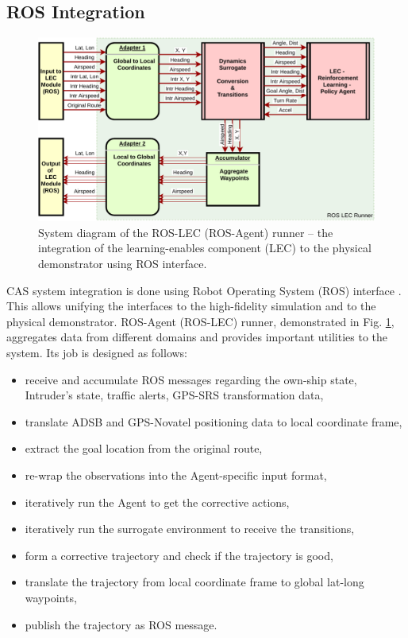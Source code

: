 \subsection{ROS Integration}

\begin{figure}[h]
	\centering
	\includegraphics[width=\linewidth]{figures/cp25_ros.pdf}
	\caption{System diagram of the ROS-LEC (ROS-Agent) runner -- the integration of the learning-enables component (LEC) to the physical demonstrator using ROS interface.}
	\label{fig:integration}
\end{figure}

CAS system integration is done using Robot Operating System (ROS) interface \cite{quigley2009ros}. This allows unifying the interfaces to the high-fidelity simulation and to the physical demonstrator.
ROS-Agent (ROS-LEC) runner, demonstrated in Fig. \ref{fig:integration}, aggregates data from different domains and provides important utilities to the system. Its job is designed as follows: 
\begin{itemize}
	\item receive and accumulate ROS messages regarding the own-ship state,
	Intruder's state, traffic alerts, GPS-SRS transformation data,
	\item translate ADSB and GPS-Novatel positioning data to local coordinate frame,
	\item extract the goal location from the original route,
	\item re-wrap the observations into the Agent-specific input format,
	\item iteratively run the Agent to get the corrective actions,
	\item iteratively run the surrogate environment to receive the transitions,
	\item form a corrective trajectory and check if the trajectory is good,
	\item translate the trajectory from local coordinate frame to global lat-long waypoints,
	\item publish the trajectory as ROS message.
\end{itemize}

